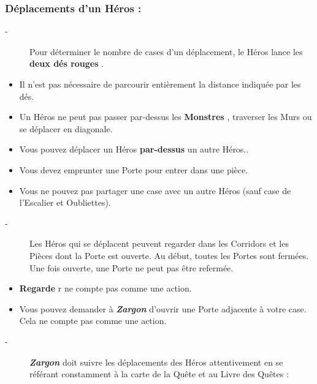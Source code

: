 \documentclass{scrartcl}%
\begin{document}
\subsubsection{ Déplacements d'un Héros :
}%
\label{ssubsec:DplacementsdunHros}%
\begin{description}%
\item[{-} ]%
%
 Pour déterminer le nombre de cases d'un déplacement, le Héros lance les %
\textcolor{mygreen}{%
\textbf{deux dés rouges}%
}%
.
%
\end{description}%
\begin{itemize}%
\item%
%
 Il n'est pas nécessaire de parcourir entièrement la distance indiquée par les dés.
%
\item%
%
 Un Héros ne peut pas passer par{-}dessus les %
\textcolor{mygreen}{%
\textbf{Monstres}%
}%
, traverser les Murs ou se déplacer en diagonale.
%
\item%
%
 Vous pouvez déplacer un Héros %
\textcolor{mygreen}{%
\textbf{par{-}dessus}%
}%
\textit{ }%
 un autre Héros..
%
\item%
%
 Vous devez emprunter une Porte pour entrer dans une pièce.
%
\item%
%
 Vous ne pouvez pas partager une case avec un autre Héros (sauf case de l'Escalier et Oubliettes).
%
\end{itemize}%
\begin{description}%
\item[{-} ]%
%
 Les Héros qui se déplacent peuvent regarder dans les Corridors et les Pièces dont la Porte est ouverte. Au début, toutes les Portes sont fermées. Une fois ouverte, une Porte ne peut pas être refermée.
%
\end{description}%
\begin{itemize}%
\item%
%
\textcolor{mygreen}{%
\textbf{Regarde}%
}%
r ne compte pas comme une action.
%
\item%
%
 Vous pouvez demander à %
\textcolor{mygreen}{\textbf{\textit{Zargon}}}%
\textit{ }%
 d'ouvrir une Porte adjacente à votre case. Cela ne compte pas comme une action.
%
\end{itemize}%
\begin{description}%
\item[{-} ]%
%
\textcolor{mygreen}{\textbf{\textit{Zargon}}}%
\textit{ }%
 doit suivre les déplacements des Héros attentivement en se référant constamment à la carte de la Quête et au Livre des Quêtes :
%
\end{description}%
\end{document}
